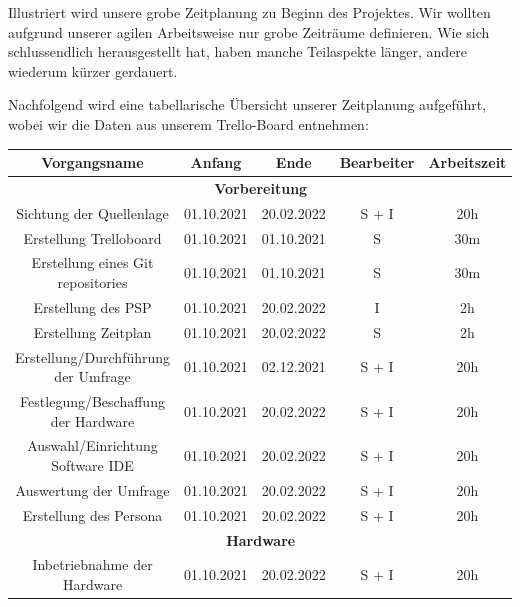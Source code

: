 Illustriert wird unsere grobe Zeitplanung zu Beginn des Projektes. Wir wollten aufgrund unserer agilen Arbeitsweise nur grobe Zeiträume definieren. Wie sich schlussendlich herausgestellt hat, haben manche Teilaspekte länger, andere wiederum kürzer gerdauert.

\newpage
Nachfolgend wird eine tabellarische Übersicht unserer Zeitplanung aufgeführt, wobei wir die Daten aus unserem Trello-Board entnehmen:
\begin{adjustwidth}{-1in}{-1in}%
	\begin{center}
		\begin{tabular}{ ccccc }
			\toprule
			{Vorgangsname} & {Anfang} & {Ende} & {Bearbeiter} & {Arbeitszeit}\\
			
			\midrule
			\multicolumn{5}{c}{\textbf{Vorbereitung}} \\
			{Sichtung der Quellenlage} & {01.10.2021} & {20.02.2022} & S + I & 20h\\
			{Erstellung Trelloboard} & {01.10.2021} & {01.10.2021} & S & 30m\\
			{Erstellung eines Git repositories} & {01.10.2021} & {01.10.2021} & S & 30m\\
			{Erstellung des PSP} & {01.10.2021} & {20.02.2022} & I & 2h\\
			{Erstellung Zeitplan} & {01.10.2021} & {20.02.2022} & S & 2h\\
			{Erstellung/Durchführung der Umfrage} & {01.10.2021} & {02.12.2021} & S + I & 20h\\
			{Festlegung/Beschaffung der Hardware} & {01.10.2021} & {20.02.2022} & S + I & 20h\\
			{Auswahl/Einrichtung Software IDE} & {01.10.2021} & {20.02.2022} & S + I & 20h\\
			{Auswertung der Umfrage} & {01.10.2021} & {20.02.2022} & S + I & 20h\\
			{Erstellung des Persona} & {01.10.2021} & {20.02.2022} & S + I & 20h\\

			\midrule
			\multicolumn{5}{c}{\textbf{Hardware}} \\
			{Inbetriebnahme der Hardware} & {01.10.2021} & {20.02.2022} & S + I & 20h\\


\end{tabular}
\end{center}
\end{adjustwidth}
